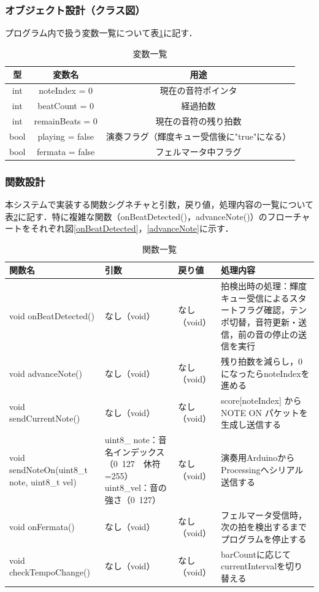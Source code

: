 \documentclass[lualatex,book,paper=a4paper,jafontsize=11.5pt,jafontscale=1.05,oneside]{jlreq}
\begin{document}
\subsubsection{オブジェクト設計（クラス図）}

プログラム内で扱う変数一覧について表\ref{variable}に記す．
\begin{table}[H]
  \centering
  \caption{変数一覧}
  \label{variable}
  \begin{tabular}{|c|c|c|}
\hline
型 & 変数名 & 用途 \\\hline \hline
int & noteIndex = 0 & 現在の音符ポインタ \\ \hline
int & beatCount = 0 & 経過拍数 \\ \hline
int & remainBeats = 0 & 現在の音符の残り拍数 \\ \hline
bool & playing = false & 演奏フラグ（輝度キュー受信後に"true"になる） \\ \hline
bool & fermata = false & フェルマータ中フラグ \\ \hline
  \end{tabular}  
\end{table}







\subsubsection{関数設計}

本システムで実装する関数シグネチャと引数，戻り値，処理内容の一覧について表\ref{functions}に記す．特に複雑な関数（onBeatDetected()，advanceNote()）のフローチャートをそれぞれ図\ref{onBeatDetected}，\ref{advanceNote}に示す．


\begin{table}[H]
  \centering
  \caption{関数一覧}
  \label{functions}
  \begin{tabularx}{\textwidth}{|p{4cm}|X|p{2cm}|X|}
    \hline
    関数名 & 引数 & 戻り値 & 処理内容 \\ \hline \hline
void onBeatDetected() & なし（void）& なし（void）& 拍検出時の処理：輝度キュー受信によるスタートフラグ確認，テンポ切替，音符更新・送信，前の音の停止の送信を実行 \\ \hline
    void advanceNote() & なし（void）& なし（void）& 残り拍数を減らし，0になったらnoteIndexを進める \\ \hline
    void sendCurrentNote() & なし（void）& なし（void）& score[noteIndex] からNOTE ON パケットを生成し送信する \\ \hline
    void sendNoteOn(uint8\_t note, uint8\_t vel) &uint8\_ note：音名インデックス（0~127　休符=255）　uint8\_vel：音の強さ（0~127）& なし（void）& 演奏用ArduinoからProcessingへシリアル送信する \\ \hline
    void onFermata() & なし（void）& なし（void）& フェルマータ受信時，次の拍を検出するまでプログラムを停止する \\ \hline
    void checkTempoChange() & なし（void）& なし（void）& barCountに応じてcurrentIntervalを切り替える \\ \hline
  \end{tabularx}  
\end{table}
\end{document}
